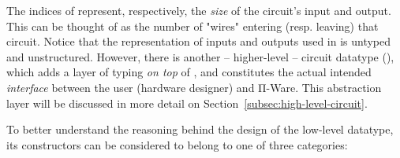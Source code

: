         The indices of  represent, respectively, the \emph{size} of the circuit's input and output.
        This can be thought of as the number of "wires" entering (resp. leaving) that circuit.
        Notice that the representation of inputs and outputs used in  is untyped and unstructured.
        However, there is another – higher-level – circuit datatype (),
        which adds a layer of typing \emph{on top} of ,
        and constitutes the actual intended \emph{interface} between the user (hardware designer) and Π-Ware.
        This abstraction layer will be discussed in more detail on Section~\ref{subsec:high-level-circuit}.

        To better understand the reasoning behind the design of the low-level  datatype,
        its constructors can be considered to belong to one of three categories:


